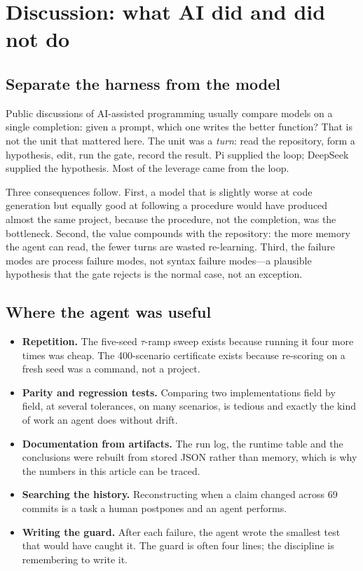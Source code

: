 \section{Discussion: what AI did and did not do}
\label{sec:discussion}

\subsection{Separate the harness from the model}
\label{sec:harness-model}

Public discussions of AI-assisted programming usually compare models on a single
completion: given a prompt, which one writes the better function? That is not the
unit that mattered here. The unit was a \emph{turn}: read the repository, form a
hypothesis, edit, run the gate, record the result. Pi supplied the loop; DeepSeek
supplied the hypothesis. Most of the leverage came from the loop.

Three consequences follow. First, a model that is slightly worse at code
generation but equally good at following a procedure would have produced almost
the same project, because the procedure, not the completion, was the bottleneck.
Second, the value compounds with the repository: the more memory the agent can
read, the fewer turns are wasted re-learning. Third, the failure modes are
process failure modes, not syntax failure modes---a plausible hypothesis that
the gate rejects is the normal case, not an exception.

\subsection{Where the agent was useful}
\label{sec:agent-good}

\begin{itemize}
  \item \textbf{Repetition.} The five-seed $\tau$-ramp sweep exists because running
        it four more times was cheap. The 400-scenario certificate exists
        because re-scoring on a fresh seed was a command, not a project.
  \item \textbf{Parity and regression tests.} Comparing two implementations
        field by field, at several tolerances, on many scenarios, is tedious
        and exactly the kind of work an agent does without drift.
  \item \textbf{Documentation from artifacts.} The run log, the runtime table
        and the conclusions were rebuilt from stored JSON rather than memory,
        which is why the numbers in this article can be traced.
  \item \textbf{Searching the history.} Reconstructing when a claim changed
        across 69 commits is a task a human postpones and an agent performs.
  \item \textbf{Writing the guard.} After each failure, the agent wrote the
        smallest test that would have caught it. The guard is often four lines;
        the discipline is remembering to write it.
\end{itemize}

